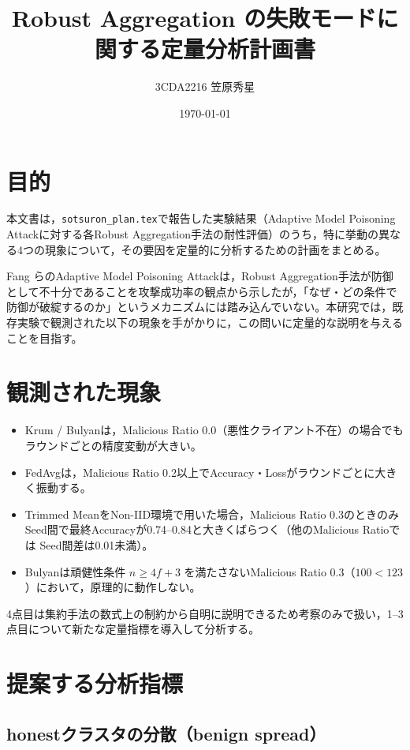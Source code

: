 \documentclass[a4j, twocolumn, dvipdfmx]{jsarticle}
\title{
Robust Aggregation の失敗モードに関する定量分析計画書
}
\author{3CDA2216 笠原秀星}
\date{\today}
\begin{document}
\maketitle

\section{目的}

本文書は，\texttt{sotsuron\_plan.tex}で報告した実験結果（Adaptive Model Poisoning Attackに対する各Robust Aggregation手法の耐性評価）のうち，特に挙動の異なる4つの現象について，その要因を定量的に分析するための計画をまとめる。

Fang ら\cite{fang2020local}のAdaptive Model Poisoning Attackは，Robust Aggregation手法が防御として不十分であることを攻撃成功率の観点から示したが，「なぜ・どの条件で防御が破綻するのか」というメカニズムには踏み込んでいない。本研究では，既存実験で観測された以下の現象を手がかりに，この問いに定量的な説明を与えることを目指す。

\section{観測された現象}

\begin{itemize}
  \item Krum / Bulyanは，Malicious Ratio 0.0（悪性クライアント不在）の場合でもラウンドごとの精度変動が大きい。
  \item FedAvgは，Malicious Ratio 0.2以上でAccuracy・Lossがラウンドごとに大きく振動する。
  \item Trimmed MeanをNon-IID環境で用いた場合，Malicious Ratio 0.3のときのみSeed間で最終Accuracyが0.74--0.84と大きくばらつく（他のMalicious Ratioでは Seed間差は0.01未満）。
  \item Bulyanは頑健性条件 $n \geq 4f+3$ を満たさないMalicious Ratio 0.3（$100 < 123$）において，原理的に動作しない。
\end{itemize}

4点目は集約手法の数式上の制約から自明に説明できるため考察のみで扱い，1--3点目について新たな定量指標を導入して分析する。

\section{提案する分析指標}

\subsection{honestクラスタの分散（benign spread）}
\end{document}
